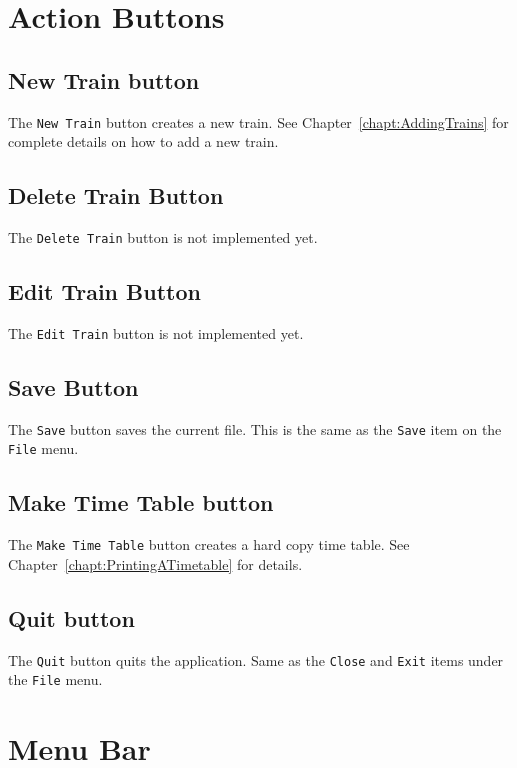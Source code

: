 \section{Action Buttons}

\subsection{New Train button}

The {\tt New Train} button creates a new train.  See
Chapter~\ref{chapt:AddingTrains} for complete details on how to add a
new train.

\subsection{Delete Train Button}

The {\tt Delete Train} button is not implemented yet.

\subsection{Edit Train Button}

The {\tt Edit Train} button is not implemented yet.

\subsection{Save Button}

The {\tt Save} button saves the current file.  This is the same as the
{\tt Save} item on the {\tt File} menu.

\subsection{Make Time Table button}

The {\tt Make Time Table} button creates a hard copy time table.  See
Chapter~\ref{chapt:PrintingATimetable} for details.

\subsection{Quit button}

The {\tt Quit} button quits the application.  Same as the {\tt Close}
and {\tt Exit} items under the {\tt File} menu.


\section{Menu Bar}

